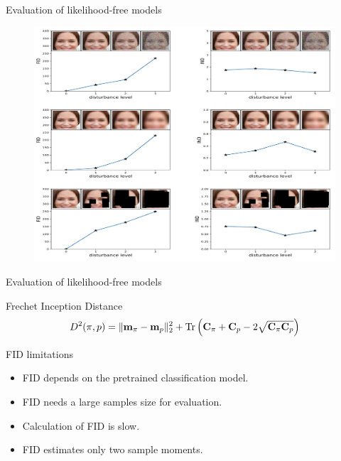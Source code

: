 \begin{frame}{Evaluation of likelihood-free models}
	\begin{figure}
		\centering
		\includegraphics[width=0.9\linewidth]{figs/fid_results}
	\end{figure}
	
\end{frame}
\begin{frame}{Evaluation of likelihood-free models}
	\begin{block}{Frechet Inception Distance}
		\vspace{-0.1cm}
		\[
		D^2 (\pi, p) = \| \mathbf{m}_{\pi} - \mathbf{m}_{p}\|_2^2 + \text{Tr} \left( \mathbf{C}_{\pi} + \mathbf{C}_p - 2 \sqrt{\mathbf{C}_{\pi} \mathbf{C}_p} \right)
		\]
	\end{block}
	\begin{block}{FID limitations}
		\begin{itemize}
			\item FID depends on the pretrained classification model.
			\item FID needs a large samples  size for evaluation.
			\item Calculation of FID is slow.
			\item FID estimates only two sample moments.
		\end{itemize}
	\end{block}

\end{frame}
